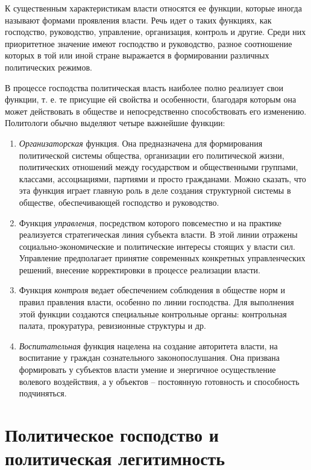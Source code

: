 К существенным характеристикам власти относятся ее функции, которые иногда
называют формами проявления власти. Речь идет о таких функциях, как господство,
руководство, управление, организация, контроль и другие. Среди них приоритетное
значение имеют господство и руководство, разное соотношение которых в той или
иной стране выражается в формировании различных политических режимов.

В процессе господства политическая власть наиболее полно реализует свои
функции, т. е. те присущие ей свойства и особенности, благодаря которым она
может действовать в обществе и непосредственно способствовать его изменению.
Политологи обычно выделяют четыре важнейшие функции:
\begin{enumerate}
    \item \emph{Организаторская} функция. Она предназначена для формирования
    политической системы общества, организации его политической жизни,
    политических отношений между государством и общественными группами,
    классами, ассоциациями, партиями и просто гражданами. Можно сказать, что
    эта функция играет главную роль в деле создания структурной системы в
    обществе, обеспечивающей господство и руководство.
    \item Функция \emph{управления}, посредством которого повсеместно и на
    практике реализуется стратегическая линия субъекта власти. В этой линии
    отражены социально-экономические и политические интересы стоящих у власти
    сил. Управление предполагает принятие современных конкретных управленческих
    решений, внесение корректировки в процессе реализации власти.
    \item Функция \emph{контроля} ведает обеспечением соблюдения в обществе
    норм и правил правления власти, особенно по линии господства. Для
    выполнения этой функции создаются специальные контрольные органы:
    контрольная палата, прокуратура, ревизионные структуры и др.
    \item \emph{Воспитательная} функция нацелена на создание авторитета власти,
    на воспитание у граждан сознательного законопослушания. Она призвана
    формировать у субъектов власти умение и энергичное осуществление волевого
    воздействия, а у объектов -- постоянную готовность и способность
    подчиняться.
\end{enumerate}

\chapter{Политическое господство и политическая легитимность}
